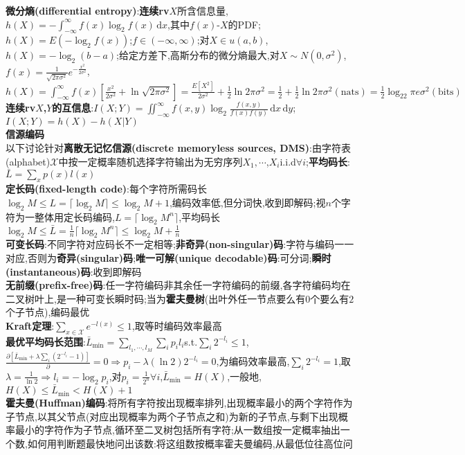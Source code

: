 \documentclass[UTF8,a4paper,10pt]{article}
\begin{document}
\begin{multicols*}{2}
\textbf{微分熵(differential entropy)}:\textbf{连续rv}$X$所含信息量,$h(X)=-\int_{-\infty}^{\infty}f(x)\log_2f(x)\,\mathrm{d}x$,其中$f(x)$-$X$的PDF;$h(X)=E(-\log_2f(x))$;$f\in(-\infty,\infty)$;对$X\in u(a,b)$,$h(X)=-\log_2(b-a)$;给定方差下,高斯分布的微分熵最大,对$X\sim N(0,\sigma^2)$,$f(x)=\frac{1}{\sqrt{2\pi\sigma^2}}e^{-\frac{x^2}{2\sigma^2}}$,$h(X)=\int_{-\infty}^{\infty}f(x)[\frac{x^2}{2\sigma^2}+\ln\sqrt{2\pi\sigma^2}]=\frac{E[X^2]}{2\sigma^2}+\frac{1}{2}\ln 2\pi\sigma^2=\frac{1}{2}+\frac{1}{2}\ln 2\pi\sigma^2(\text{nats})=\frac{1}{2}\log_22\pi e\sigma^2(\text{bits})$\\
\textbf{连续rv$X$,$Y$的互信息}:$I(X;Y)=\iint_{-\infty}^{\infty}f(x,y)\log_2\frac{f(x,y)}{f(x)f(y)}\,\mathrm{d}x\,\mathrm{d}y$;$I(X;Y)=h(X)-h(X\vert Y)$\\
\textbf{信源编码}\hrulefill\\
以下讨论针对\textbf{离散无记忆信源(discrete memoryless sources, DMS)}:由字符表(alphabet)$\mathcal{X}$中按一定概率随机选择字符输出为无穷序列$X_1,\cdots$,$X_i$i.i.d$\forall i$;\textbf{平均码长}:$\bar{L}=\sum_xp(x)l(x)$\\
\textbf{定长码(fixed-length code)}:每个字符所需码长$\log_2M\leq L=\lceil\log_2M\rceil\leq\log_2M+1$,编码效率低,但分词快,收到即解码;视$n$个字符为一整体用定长码编码,$L=\lceil\log_2M^n\rceil$,平均码长$\log_2M\leq\bar{L}=\frac{1}{n}\lceil\log_2M^n\rceil\leq\log_2M+\frac{1}{n}$\\
\textbf{可变长码}:不同字符对应码长不一定相等;\textbf{非奇异(non-singular)码}:字符与编码一一对应,否则为\textbf{奇异(singular)码};\textbf{唯一可解(unique decodable)码}:可分词;\textbf{瞬时(instantaneous)码}:收到即解码\\
\textbf{无前缀(prefix-free)码}:任一字符编码非其余任一字符编码的前缀,各字符编码均在二叉树叶上,是一种可变长瞬时码;当为\textbf{霍夫曼树}(出叶外任一节点要么有$0$个要么有$2$个子节点),编码最优\\
\textbf{Kraft定理}:$\sum_{x\in\mathcal{X}}e^{-l(x)}\leq 1$,取等时编码效率最高\\
\textbf{最优平均码长范围}:$\bar{L}_{\min}=\sum_{l_1,\cdots,l_M}\sum_ip_il_i$s.t.$\sum_i2^{-l_i}\leq 1$,$\frac{\partial[\bar{L}_{\min}+\lambda\sum_i(2^{-l_i}-1)]}{\partial}=0\Rightarrow p_i-\lambda(\ln 2)2^{-l_i}=0$,为编码效率最高,$\sum_i2^{-l_i}=1$,取$\lambda=\frac{1}{\ln 2}\Rightarrow l_i=-\log_2p_i$,对$p_i=\frac{1}{2^n}\forall i$,$\bar{L}_{\min}=H(X)$,一般地,$H(X)\leq\bar{L}_{\min}<H(X)+1$\\
\textbf{霍夫曼(Huffman)编码}:将所有字符按出现概率排列,出现概率最小的两个字符作为子节点,以其父节点(对应出现概率为两个子节点之和)为新的子节点,与剩下出现概率最小的字符作为子节点,循环至二叉树包括所有字符;从一数组按一定概率抽出一个数,如何用判断题最快地问出该数:将这组数按概率霍夫曼编码,从最低位往高位问\\

\end{multicols*}
\end{document}
